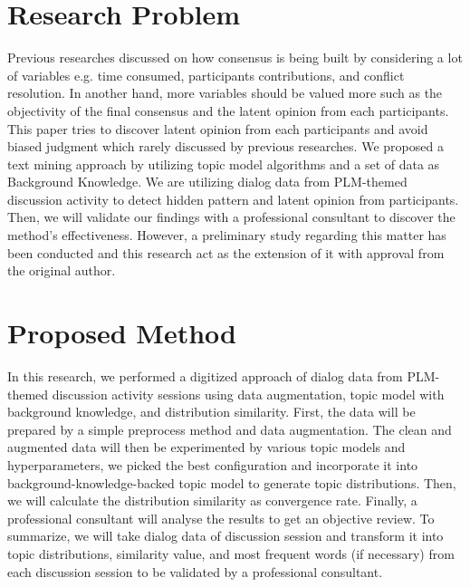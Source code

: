 \documentclass[10pt, conference, compsocconf]{IEEEtran}
\begin{document}
\section{Research Problem}
\label{sec_rp}
Previous researches discussed on how consensus is being built by considering  a lot of variables e.g. time consumed, participants contributions, and conflict resolution. In another hand, more variables should be valued more such as the objectivity of the final consensus and the latent opinion from each participants. This paper tries to discover latent opinion from each participants and avoid biased judgment which rarely discussed by previous researches. We proposed a text mining approach by utilizing topic model algorithms and a set of data as Background Knowledge. We are utilizing dialog data from PLM-themed discussion activity to detect hidden pattern and latent opinion from participants. Then, we will validate our findings with a professional consultant to discover the method's effectiveness. However, a preliminary study regarding this matter has been conducted\cite{b4} and this research act as the extension of it with approval from the original author.




\section{Proposed Method}
In this research, we performed a digitized approach of dialog data from PLM-themed discussion activity sessions using data augmentation, topic model with background knowledge, and distribution similarity. First, the data will be prepared by a simple preprocess method and data augmentation. The clean and augmented data will then be experimented by various topic models and hyperparameters, we picked the best configuration and incorporate it into background-knowledge-backed topic model to generate topic distributions. Then, we will calculate the distribution similarity as convergence rate. Finally, a professional consultant will analyse the results to get an objective review. To summarize, we will take dialog data of discussion session and transform it into topic distributions, similarity value, and most frequent words (if necessary) from each discussion session to be validated by a professional consultant.
\end{document}
